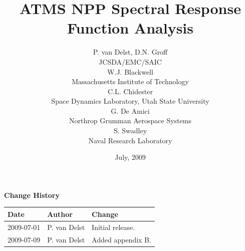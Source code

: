 


%


\newcommand{\frequency}[1]{\ensuremath{f_{#1}}}
\newcommand{\bfrequency}[1]{\boldmath\frequency{#1}\unboldmath}
\newcommand{\bdf}[1]{\boldmath\df{#1}\unboldmath}
\newcommand{\sideband}[1]{\ensuremath{df_{#1}}}
\newcommand{\bsideband}[1]{\boldmath\sideband{#1}\unboldmath}
\newcommand{\bdeltaf}{\boldmath\ensuremath{\Delta f}\unboldmath}
\newcommand{\up}[1]{\superscript{#1}}

\title{ATMS NPP Spectral Response Function Analysis}
\author{P. van Delst,
        D.N. Groff\\JCSDA/EMC/SAIC\\[0.25in]
        W.J. Blackwell\\Massachusetts Institute of Technology\\[0.25in]
        C.L. Chidester\\Space Dynamics Laboratory, Utah State University\\[0.25in]
        G. De Amici\\Northrop Grumman Aerospace Systems\\[0.25in]
        S. Swadley\\Naval Research Laboratory}
\date{July, 2009}



\maketitle

\draftwatermark

\thispagestyle{empty}
\vspace*{10cm}
\begin{center}
  {\sffamily\Large\bfseries Change History}
  \begin{table}[htp]
    \centering
    \begin{tabular}{|p{2cm}|p{3cm}|p{8cm}|}
      \hline
      \sffamily\textbf{Date} & \sffamily\textbf{Author} & \sffamily\textbf{Change}\\
      \hline\hline
      2009-07-01 & P. van Delst & Initial release.\\
      \hline
      2009-07-09 & P. van Delst & Added appendix B.\\
      \hline
    \end{tabular}
  \end{table}
\end{center}
\clearpage
{}
\setcounter{page}{1}


